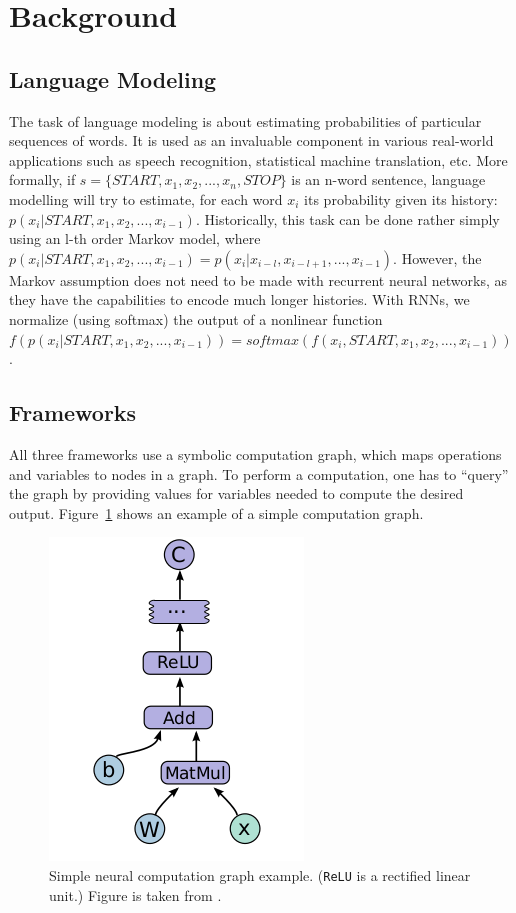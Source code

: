 \documentclass{article}
\begin{document}
\section{Background}
\subsection{Language Modeling}
The task of language modeling is about estimating probabilities of particular sequences of words. It is used as an invaluable component in various real-world applications such as speech recognition, statistical machine translation, etc. More formally, if $s=\{START,x_1,x_2,...,x_n,STOP\}$ is an n-word sentence, language modelling will try to estimate, for each word $x_i$
its probability given its history: $p(x_i|START,x_1,x_2,...,x_{i-1})$. 
Historically, this task can be done rather simply using an l-th order Markov model, where $p(x_i|START,x_1,x_2,...,x_{i-1}) = p(x_i|x_{i-l},x_{i-l+1},...,x_{i-1})$. However, the Markov assumption does not need to be made with recurrent neural networks, as they have the capabilities to encode much longer histories. With RNNs, we normalize (using softmax) the output of a nonlinear function $f\left(p(x_i|START,x_1,x_2,...,x_{i-1})\right) =softmax\left(f(x_i,START,x_1,x_2,...,x_{i-1})\right)$.

\subsection{Frameworks}
All three frameworks use a symbolic computation graph, which maps operations and variables to nodes in a graph. To perform a computation, one has to ``query'' the graph by providing values for variables needed to compute the desired output.
Figure~\ref{fig:compGraph} shows an example of a simple computation graph.

\begin{figure}\begin{center}
\includegraphics[scale=.4]{graphics/tensorflowGraph.png}
\caption{\label{fig:compGraph}Simple neural computation graph example. (\texttt{ReLU} is a rectified linear unit.) Figure is taken from \protect\cite{tensorflow}.} 
\end{center}\end{figure}
\end{document}
